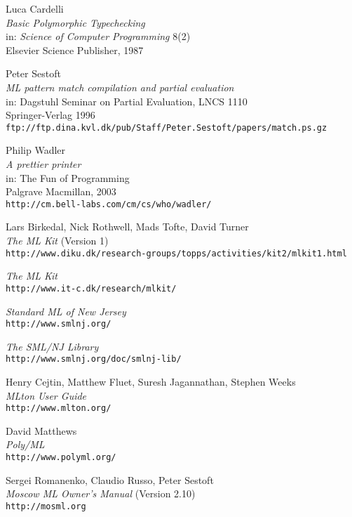 \documentclass[twoside,titlepage]{article}
\begin{document}
\begin{appendix}
\begin{thebibliography}{MTHM97}
Luca Cardelli \\
{\it Basic Polymorphic Typechecking} \\
in: {\it Science of Computer Programming} 8(2) \\
Elsevier Science Publisher, 1987

Peter Sestoft \\
{\it ML pattern match compilation and partial evaluation} \\
in: Dagstuhl Seminar on Partial Evaluation, LNCS 1110 \\
Springer-Verlag 1996 \\
{\small\tt{ftp://ftp.dina.kvl.dk/pub/Staff/Peter.Sestoft/papers/match.ps.gz}}

Philip Wadler \\
{\it A prettier printer} \\
in: The Fun of Programming \\
Palgrave Macmillan, 2003 \\
{\small\tt{http://cm.bell-labs.com/cm/cs/who/wadler/}}

Lars Birkedal, Nick Rothwell, Mads Tofte, David Turner \\
{\it The ML Kit} (Version 1) \\
{\small\tt{http://www.diku.dk/research-groups/topps/activities/kit2/mlkit1.html}}

{\it The ML Kit} \\
{\small\tt{http://www.it-c.dk/research/mlkit/}}

{\it Standard ML of New Jersey} \\
{\small\tt{http://www.smlnj.org/}}

{\it The SML/NJ Library} \\
{\small\tt{http://www.smlnj.org/doc/smlnj-lib/}}

Henry Cejtin, Matthew Fluet, Suresh Jagannathan, Stephen Weeks \\
{\it MLton User Guide} \\
{\small\tt{http://www.mlton.org/}}

David Matthews \\
{\it Poly/ML} \\
{\small\tt{http://www.polyml.org/}}

Sergei Romanenko, Claudio Russo, Peter Sestoft \\
{\it Moscow ML Owner's Manual} (Version 2.10) \\
{\small\tt{http://mosml.org}}


\end{thebibliography}
\end{appendix}
\end{document}
